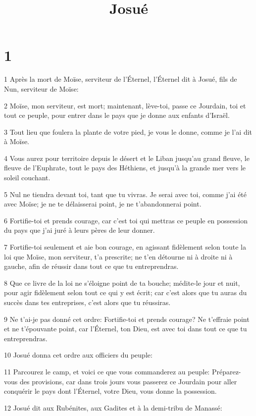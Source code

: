 

\title{Josué}


\chapter{1}

\par 1 Après la mort de Moïse, serviteur de l'Éternel, l'Éternel dit à Josué, fils de Nun, serviteur de Moïse:
\par 2 Moïse, mon serviteur, est mort; maintenant, lève-toi, passe ce Jourdain, toi et tout ce peuple, pour entrer dans le pays que je donne aux enfants d'Israël.
\par 3 Tout lieu que foulera la plante de votre pied, je vous le donne, comme je l'ai dit à Moïse.
\par 4 Vous aurez pour territoire depuis le désert et le Liban jusqu'au grand fleuve, le fleuve de l'Euphrate, tout le pays des Héthiens, et jusqu'à la grande mer vers le soleil couchant.
\par 5 Nul ne tiendra devant toi, tant que tu vivras. Je serai avec toi, comme j'ai été avec Moïse; je ne te délaisserai point, je ne t'abandonnerai point.
\par 6 Fortifie-toi et prends courage, car c'est toi qui mettras ce peuple en possession du pays que j'ai juré à leurs pères de leur donner.
\par 7 Fortifie-toi seulement et aie bon courage, en agissant fidèlement selon toute la loi que Moïse, mon serviteur, t'a prescrite; ne t'en détourne ni à droite ni à gauche, afin de réussir dans tout ce que tu entreprendras.
\par 8 Que ce livre de la loi ne s'éloigne point de ta bouche; médite-le jour et nuit, pour agir fidèlement selon tout ce qui y est écrit; car c'est alors que tu auras du succès dans tes entreprises, c'est alors que tu réussiras.
\par 9 Ne t'ai-je pas donné cet ordre: Fortifie-toi et prends courage? Ne t'effraie point et ne t'épouvante point, car l'Éternel, ton Dieu, est avec toi dans tout ce que tu entreprendras.
\par 10 Josué donna cet ordre aux officiers du peuple:
\par 11 Parcourez le camp, et voici ce que vous commanderez au peuple: Préparez-vous des provisions, car dans trois jours vous passerez ce Jourdain pour aller conquérir le pays dont l'Éternel, votre Dieu, vous donne la possession.
\par 12 Josué dit aux Rubénites, aux Gadites et à la demi-tribu de Manassé:
